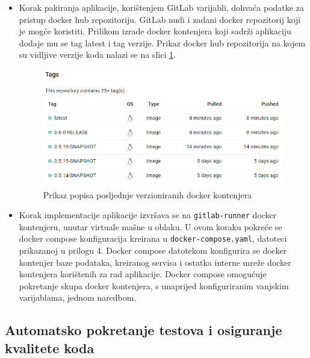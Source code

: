 \documentclass[a4paper,12pt,oneside]{article}
\begin{document}
\begin{itemize}

\item{Korak pakiranja aplikacije, korištenjem GitLab varijabli, dohvaća podatke za pristup docker hub repozitoriju. GitLab nudi i zadani docker repozitorij koji je mogće koristiti. Prilikom izrade docker kontenjera koji sadrži aplikaciju dodaje mu se tag latest i tag verzije. Prikaz docker hub repozitorija na kojem su vidljive verzije koda nalazi se na slici \ref{fig:docker-versions}}. 

\begin{figure}
    \centering
    \includegraphics[width=0.6\linewidth]{Slike/docker-versions.png}
    \caption{Prikaz popisa posljednje verzioniranih docker kontenjera}
    \label{fig:docker-versions}
\end{figure}

\item Korak implementacije aplikacije izvršava se na \texttt{gitlab-runner} docker kontenjeru, unutar virtuale mašne u oblaku. U ovom koraku pokreće se docker compose konfiguracija kreirana u \texttt{docker-compose.yaml}, datoteci prikazanoj u prilogu 4. Docker compose datotekom konfigurira se docker kontenjer baze podataka, kreiranog servisa i ostatka interne mreže docker kontenjera korištenih za rad aplikacije. Docker compose omogućuje pokretanje skupa docker kontenjera, s unaprijed konfiguriranim vanjskim varijablama, jednom naredbom.




\end{itemize}


\subsection{Automatsko pokretanje testova i osiguranje kvalitete koda}
\end{document}
